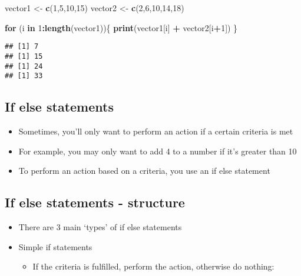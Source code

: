 \documentclass[]{article}
\newenvironment{Shaded}{\begin{snugshade}}{\end{snugshade}}
\newcommand{\KeywordTok}[1]{\textcolor[rgb]{0.13,0.29,0.53}{\textbf{#1}}}
\newcommand{\DecValTok}[1]{\textcolor[rgb]{0.00,0.00,0.81}{#1}}
\newcommand{\StringTok}[1]{\textcolor[rgb]{0.31,0.60,0.02}{#1}}
\newcommand{\ControlFlowTok}[1]{\textcolor[rgb]{0.13,0.29,0.53}{\textbf{#1}}}
\newcommand{\OperatorTok}[1]{\textcolor[rgb]{0.81,0.36,0.00}{\textbf{#1}}}
\newcommand{\NormalTok}[1]{#1}
\providecommand{\tightlist}{%
  \setlength{\itemsep}{0pt}\setlength{\parskip}{0pt}}
\begin{document}
\begin{Shaded}
\begin{Highlighting}[]
\NormalTok{vector1 <-}\StringTok{ }\KeywordTok{c}\NormalTok{(}\DecValTok{1}\NormalTok{,}\DecValTok{5}\NormalTok{,}\DecValTok{10}\NormalTok{,}\DecValTok{15}\NormalTok{)}
\NormalTok{vector2 <-}\StringTok{ }\KeywordTok{c}\NormalTok{(}\DecValTok{2}\NormalTok{,}\DecValTok{6}\NormalTok{,}\DecValTok{10}\NormalTok{,}\DecValTok{14}\NormalTok{,}\DecValTok{18}\NormalTok{)}

\ControlFlowTok{for}\NormalTok{ (i }\ControlFlowTok{in} \DecValTok{1}\OperatorTok{:}\KeywordTok{length}\NormalTok{(vector1))\{}
  \KeywordTok{print}\NormalTok{(vector1[i] }\OperatorTok{+}\StringTok{ }\NormalTok{vector2[i}\OperatorTok{+}\DecValTok{1}\NormalTok{])}
\NormalTok{\}}
\end{Highlighting}
\end{Shaded}

\begin{verbatim}
## [1] 7
## [1] 15
## [1] 24
## [1] 33
\end{verbatim}

\subsection{If else statements}\label{if-else-statements}

\begin{itemize}
\tightlist
\item
  Sometimes, you'll only want to perform an action if a certain criteria
  is met
\item
  For example, you may only want to add 4 to a number if it's greater
  than 10
\item
  To perform an action based on a criteria, you use an if else statement
\end{itemize}

\subsection{If else statements -
structure}\label{if-else-statements---structure}

\begin{itemize}
\tightlist
\item
  There are 3 main `types' of if else statements
\item
  Simple if statements

  \begin{itemize}
  \tightlist
  \item
    If the criteria is fulfilled, perform the action, otherwise do
    nothing:
  \end{itemize}
\end{itemize}
\end{document}

